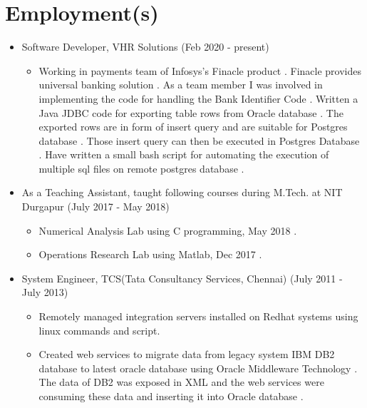 \documentclass[a4paper,10pt]{article}
\begin{document}
	\section{Employment(s)}
	\begin{itemize}
	        \item Software Developer, VHR Solutions (Feb 2020 - present)
                \begin{itemize}
                    \item Working in payments team of Infosys’s Finacle product . Finacle provides universal banking solution . As a team member I was involved in implementing the code for handling the Bank Identifier Code . Written a Java JDBC code for exporting table rows from Oracle database . The exported rows are in form of insert query and are suitable for Postgres database . Those insert query can then be executed in Postgres Database . Have written a small bash script for automating the execution of multiple sql files on remote postgres database .
                \end{itemize}
			\item As  a Teaching Assistant, taught following courses during M.Tech. at NIT Durgapur (July 2017 - May 2018)
                \begin{itemize}
                    \item Numerical Analysis Lab using C programming, May 2018 .
                    \item Operations Research Lab using Matlab, Dec 2017 .
                \end{itemize}
            \item System Engineer, TCS(Tata Consultancy Services, Chennai) (July 2011 - July 2013)
		        \begin{itemize}
			    	\item Remotely managed integration servers installed on Redhat systems using linux commands and script.
					\item Created web services to migrate data from legacy system IBM DB2 database to latest oracle database using Oracle Middleware Technology .
					The data  of DB2 was exposed in XML  and the web services were consuming these data and inserting it into Oracle database .
			\end{itemize}
	\end{itemize}
    
    
\end{document}
